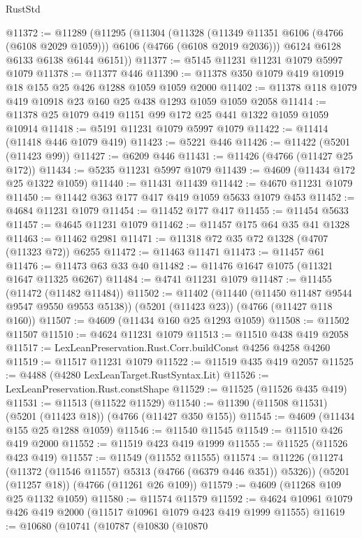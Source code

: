 \begin{lexlean}{RustStd}
\begin{coremodule}
@11372 := @11289
    (@11295
      (@11304
        (@11328 (@11349 @11351 @6106 (@4766 (@6108 @2029 @1059))) @6106 (@4766 (@6108 @2019 @2036)))
        @6124
        @6128
        @6133
        @6138
        @6144
        @6151))
@11377 := @5145 @11231 @11231 @1079 @5997 @1079
@11378 := @11377 @446
@11390 := @11378 @350 @1079 @419 @10919 @18 @155 @25 @426 @1288 @1059 @1059 @2000
@11402 := @11378 @118 @1079 @419 @10918 @23 @160 @25 @438 @1293 @1059 @1059 @2058
@11414 := @11378 @25 @1079 @419 @1151 @99 @172 @25 @441 @1322 @1059 @1059 @10914
@11418 := @5191 @11231 @1079 @5997 @1079
@11422 := @11414 (@11418 @446 @1079 @419)
@11423 := @5221 @446
@11426 := @11422 (@5201 (@11423 @99))
@11427 := @6209 @446
@11431 := @11426 (@4766 (@11427 @25 @172))
@11434 := @5235 @11231 @5997 @1079
@11439 := @4609 (@11434 @172 @25 @1322 @1059)
@11440 := @11431 @11439
@11442 := @4670 @11231 @1079
@11450 := @11442 @363 @177 @417 @419 @1059 @5633 @1079 @453
@11452 := @4684 @11231 @1079
@11454 := @11452 @177 @417
@11455 := @11454 @5633
@11457 := @4645 @11231 @1079
@11462 := @11457 @175 @64 @35 @41 @1328
@11463 := @11462 @2981
@11471 := @11318 @72 @35 @72 @1328 (@4707 (@11323 @72)) @6255
@11472 := @11463 @11471
@11473 := @11457 @61
@11476 := @11473 @63 @33 @40
@11482 := @11476 @1647 @1075 (@11321 @1647 @11325 @6267)
@11484 := @4741 @11231 @1079
@11487 := @11455 (@11472 (@11482 @11484))
@11502 := @11402
    (@11440 (@11450 @11487 @9544 @9547 @9550 @9553 @5138))
    (@5201 (@11423 @23))
    (@4766 (@11427 @118 @160))
@11507 := @4609 (@11434 @160 @25 @1293 @1059)
@11508 := @11502 @11507
@11510 := @4624 @11231 @1079
@11513 := @11510 @438 @419 @2058
@11517 := LexLeanPreservation.Rust.Corr.buildConst @4256 @4258 @4260
@11519 := @11517 @11231 @1079
@11522 := @11519 @435 @419 @2057
@11525 := @4488 (@4280 LexLeanTarget.RustSyntax.Lit)
@11526 := LexLeanPreservation.Rust.constShape
@11529 := @11525 (@11526 @435 @419)
@11531 := @11513 (@11522 @11529)
@11540 := @11390 (@11508 @11531) (@5201 (@11423 @18)) (@4766 (@11427 @350 @155))
@11545 := @4609 (@11434 @155 @25 @1288 @1059)
@11546 := @11540 @11545
@11549 := @11510 @426 @419 @2000
@11552 := @11519 @423 @419 @1999
@11555 := @11525 (@11526 @423 @419)
@11557 := @11549 (@11552 @11555)
@11574 := @11226
    (@11274 (@11372 (@11546 @11557) @5313 (@4766 (@6379 @446 @351)) @5326))
    (@5201 (@11257 @18))
    (@4766 (@11261 @26 @109))
@11579 := @4609 (@11268 @109 @25 @1132 @1059)
@11580 := @11574 @11579
@11592 := @4624 @10961 @1079 @426 @419 @2000 (@11517 @10961 @1079 @423 @419 @1999 @11555)
@11619 := @10680
    (@10741
      (@10787
        (@10830
          (@10870

\end{coremodule}
\end{lexlean}

